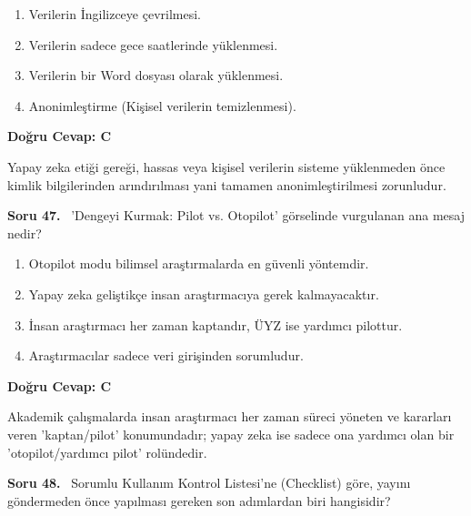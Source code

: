 \documentclass[11pt,a4paper,openany]{book}
\begin{document}
\begin{enumerate}[label=\Alph*), leftmargin=25pt, topsep=4pt, itemsep=2pt]
        \item Verilerin İngilizceye çevrilmesi.
        \item Verilerin sadece gece saatlerinde yüklenmesi.
        \item Verilerin bir Word dosyası olarak yüklenmesi.
        \item Anonimleştirme (Kişisel verilerin temizlenmesi).
\end{enumerate}

\vspace{4pt}
\begin{tcolorbox}[title=Cevap ve Açıklama, colback=gray!3!white, colframe=primarycolor!90!black, arc=2mm, fonttitle=\bfseries\sffamily, top=6pt, bottom=6pt]
    \textbf{Doğru Cevap: C}

    \vspace{2pt}
    Yapay zeka etiği gereği, hassas veya kişisel verilerin sisteme yüklenmeden önce kimlik bilgilerinden arındırılması yani tamamen anonimleştirilmesi zorunludur.
\end{tcolorbox}
\vspace{10pt}
\needspace{5cm}
\vspace{8pt}
\noindent\textbf{\large\sffamily Soru 47.} \ 'Dengeyi Kurmak: Pilot vs. Otopilot' görselinde vurgulanan ana mesaj nedir?

\begin{enumerate}[label=\Alph*), leftmargin=25pt, topsep=4pt, itemsep=2pt]
        \item Otopilot modu bilimsel araştırmalarda en güvenli yöntemdir.
        \item Yapay zeka geliştikçe insan araştırmacıya gerek kalmayacaktır.
        \item İnsan araştırmacı her zaman kaptandır, ÜYZ ise yardımcı pilottur.
        \item Araştırmacılar sadece veri girişinden sorumludur.
\end{enumerate}

\vspace{4pt}
\begin{tcolorbox}[title=Cevap ve Açıklama, colback=gray!3!white, colframe=primarycolor!90!black, arc=2mm, fonttitle=\bfseries\sffamily, top=6pt, bottom=6pt]
    \textbf{Doğru Cevap: C}

    \vspace{2pt}
    Akademik çalışmalarda insan araştırmacı her zaman süreci yöneten ve kararları veren 'kaptan/pilot' konumundadır; yapay zeka ise sadece ona yardımcı olan bir 'otopilot/yardımcı pilot' rolündedir.
\end{tcolorbox}
\vspace{10pt}
\needspace{5cm}
\vspace{8pt}
\noindent\textbf{\large\sffamily Soru 48.} \ Sorumlu Kullanım Kontrol Listesi'ne (Checklist) göre, yayını göndermeden önce yapılması gereken son adımlardan biri hangisidir?
\end{document}
